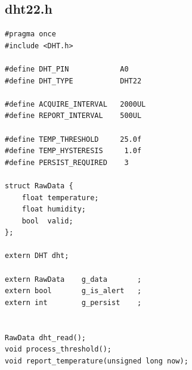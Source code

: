 \documentclass[12pt,a4paper]{article}
\begin{document}
\subsection{dht22.h}
\begin{lstlisting}
#pragma once
#include <DHT.h>

#define DHT_PIN            A0
#define DHT_TYPE           DHT22

#define ACQUIRE_INTERVAL   2000UL
#define REPORT_INTERVAL    500UL

#define TEMP_THRESHOLD     25.0f
#define TEMP_HYSTERESIS     1.0f
#define PERSIST_REQUIRED    3

struct RawData {
    float temperature;
    float humidity;
    bool  valid;
};

extern DHT dht; 

extern RawData    g_data       ;
extern bool       g_is_alert   ;
extern int        g_persist    ;


RawData dht_read();
void process_threshold();
void report_temperature(unsigned long now);
\end{lstlisting}
\end{document}
